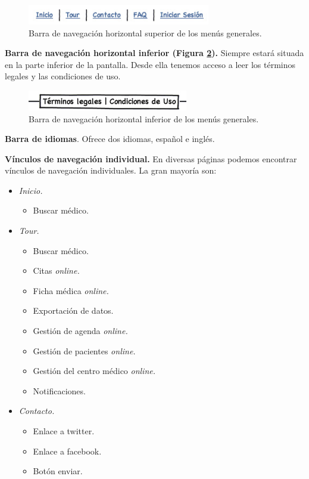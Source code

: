 		\begin{figure}[H]
		  \centering
		    \includegraphics[width=8cm]{img/jpg/nav/general_sup.jpg}
		  \caption{Barra de navegación horizontal superior de los menús generales.}
		  \label{fig:nav_general_sup}
		\end{figure}
		
		\textbf{Barra de navegación horizontal inferior (Figura \ref{fig:nav_general_inf}).} Siempre estará situada en la parte inferior de la pantalla. Desde ella tenemos acceso a leer los términos legales y las condiciones de uso.
		
		\begin{figure}[H]
		  \centering
		    \includegraphics[width=7cm]{img/jpg/nav/general_inf.jpg}
		  \caption{Barra de navegación horizontal inferior de los menús generales.}
		  \label{fig:nav_general_inf}
		\end{figure}
		
		\textbf{Barra de idiomas}. Ofrece dos idiomas, español e inglés.
		
		\textbf{Vínculos de navegación individual.} En diversas páginas podemos encontrar vínculos de navegación individuales. La gran mayoría son:
		\begin{itemize}
			\item \textit{Inicio.}
				\begin{itemize}
					\item Buscar médico.
				\end{itemize}
			\item \textit{Tour.}
				\begin{itemize}
					\item Buscar médico.
					\item Citas \textit{online.}
					\item Ficha médica \textit{online.}
					\item Exportación de datos.
					\item Gestión de agenda \textit{online.}
					\item Gestión de pacientes \textit{online.}
					\item Gestión del centro médico \textit{online.}
					\item Notificaciones.
				\end{itemize}
			\item \textit{Contacto.}
				\begin{itemize}
					\item Enlace a twitter.
					\item Enlace a facebook.
					\item Botón enviar.
				\end{itemize}
		\end{itemize}
		
